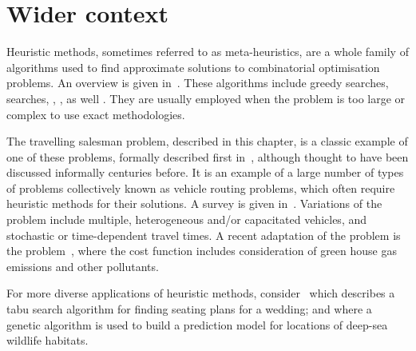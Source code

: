 \section{Wider context}\label{sec:heuristics_wider_context}

Heuristic methods, sometimes referred to as meta-heuristics, are a whole family
of algorithms used to find approximate solutions to combinatorial optimisation
problems. An overview is given in~\cite{bozorg2017meta}. These algorithms
include greedy searches,  searches, , ,
as well . They are usually employed when the problem is too
large or complex to use exact methodologies.

The travelling salesman problem, described in this chapter, is a classic example
of one of these problems, formally described first in~\cite{menger1932},
although thought to have been discussed informally centuries before.
It is an example of a large number of types of problems collectively known as
vehicle routing problems, which often require heuristic methods for their
solutions. A survey is given in~\cite{braekers2016vehicle}. Variations of
the problem include multiple, heterogeneous and/or capacitated vehicles, and
stochastic or time-dependent travel times. A recent adaptation of the problem
is the  problem~\cite{moghdani2021green}, where the
cost function includes consideration of green house gas emissions and other
pollutants.

For more diverse applications of heuristic methods,
consider~\cite{lewis2016creating} which describes a tabu search algorithm
for finding seating plans for a wedding; and \cite{tong2013modeling} where
a genetic algorithm is used to build a prediction model for locations of
deep-sea wildlife habitats.
